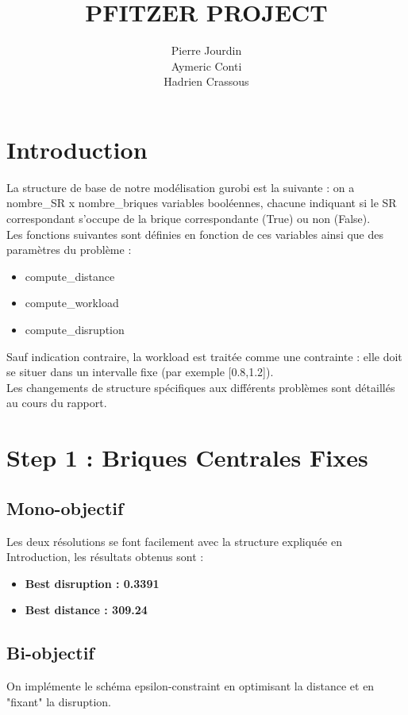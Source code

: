 \documentclass[12pt,a4paper]{article}
\title{PFITZER PROJECT}
\author{Pierre Jourdin \\ Aymeric Conti \\ Hadrien Crassous}
\begin{document}
\maketitle

\section*{Introduction}

La structure de base de notre modélisation gurobi est la suivante : on a nombre\_SR x nombre\_briques variables booléennes, chacune indiquant si le SR correspondant s'occupe de la brique correspondante (True) ou non (False).\\
Les fonctions suivantes sont définies en fonction de ces variables ainsi que des paramètres du problème :
\begin{itemize}
    \item compute\_distance
    \item compute\_workload
    \item compute\_disruption
\end{itemize}
Sauf indication contraire, la workload est traitée comme une contrainte : elle doit se situer dans un intervalle fixe (par exemple [0.8,1.2]).\\
Les changements de structure spécifiques aux différents problèmes sont détaillés au cours du rapport.

\section*{Step 1 : Briques Centrales Fixes}

\subsection*{Mono-objectif}

Les deux résolutions se font facilement avec la structure expliquée en Introduction, les résultats obtenus sont :
\begin{itemize}
    \item \textbf{Best disruption : 0.3391}
    \item \textbf{Best distance : 309.24}
\end{itemize}

\subsection*{Bi-objectif}
On implémente le schéma epsilon-constraint en optimisant la distance et en "fixant" la disruption.
\end{document}
